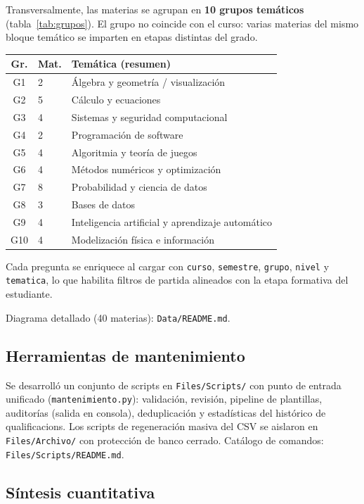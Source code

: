 \documentclass[11pt,a4paper]{article}
\newcommand{\iniciotabla}{\par\medskip\renewcommand{\arraystretch}{1.12}}
\newcommand{\fintabla}{\par\medskip}
\begin{document}
Transversalmente, las materias se agrupan en \textbf{10 grupos temáticos} (tabla~\ref{tab:grupos}). El grupo no coincide con el curso: varias materias del mismo bloque temático se imparten en etapas distintas del grado.

{\small\iniciotabla
\begin{tabular}{@{}clp{5.8cm}@{}}
\toprule
\textbf{Gr.} & \textbf{Mat.} & \textbf{Temática (resumen)} \\
\midrule
G1 & 2 & Álgebra y geometría / visualización \\
G2 & 5 & Cálculo y ecuaciones \\
G3 & 4 & Sistemas y seguridad computacional \\
G4 & 2 & Programación de software \\
G5 & 4 & Algoritmia y teoría de juegos \\
G6 & 4 & Métodos numéricos y optimización \\
G7 & 8 & Probabilidad y ciencia de datos \\
G8 & 3 & Bases de datos \\
G9 & 4 & Inteligencia artificial y aprendizaje automático \\
G10 & 4 & Modelización física e información \\
\bottomrule
\end{tabular}
\label{tab:grupos}
\fintabla}

Cada pregunta se enriquece al cargar con \texttt{curso}, \texttt{semestre}, \texttt{grupo}, \texttt{nivel} y \texttt{tematica}, lo que habilita filtros de partida alineados con la etapa formativa del estudiante.

Diagrama detallado (40 materias): \texttt{Data/README.md}.

\subsection{Herramientas de mantenimiento}

Se desarrolló un conjunto de scripts en \texttt{Files/Scripts/} con punto de entrada unificado (\texttt{mantenimiento.py}): validación, revisión, pipeline de plantillas, auditorías (salida en consola), deduplicación y estadísticas del histórico de qualificacions. Los scripts de regeneración masiva del CSV se aislaron en \texttt{Files/Archivo/} con protección de banco cerrado. Catálogo de comandos: \texttt{Files/Scripts/README.md}.

\subsection{Síntesis cuantitativa}
\end{document}
